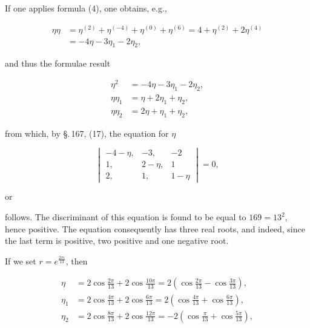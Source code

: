 
If one applies formula (4), one obtains, e.g.,

\[
\begin{aligned}
\eta\eta &= \eta^{(2)} + \eta^{(-4)} + \eta^{(0)} + \eta^{(6)} = 4 + \eta^{(2)} + 2\eta^{(4)}\\
&= -4\eta - 3\eta_1 - 2\eta_2,
\end{aligned}
\]

and thus the formulae result

\[
\begin{aligned}
\eta^2 &= -4\eta - 3\eta_1 - 2\eta_2,\\
\eta\eta_1 &= \eta + 2\eta_1 + \eta_2,\\
\eta\eta_2 &= 2\eta + \eta_1 + \eta_2,
\end{aligned}
\]

from which, by \S.\,167, (17), the equation for $\eta$

\[
\begin{vmatrix}
-4-\eta, & -3, & -2\\
1, & 2-\eta, & 1\\
2, & 1, & 1-\eta
\end{vmatrix} = 0,
\]

or


follows. The discriminant of this equation is found to be equal to
$169 = 13^2$, hence positive. The equation consequently has three real
roots, and indeed, since the last term is positive, two positive and one
negative root.

If we set $r = e^{\frac{2\pi i}{13}}$, then

\[
\begin{aligned}
\eta &= 2\cos\frac{2\pi}{13} + 2\cos\frac{10\pi}{13} = 2\left(\cos\frac{2\pi}{13} - \cos\frac{3\pi}{13}\right),\\
\eta_1 &= 2\cos\frac{4\pi}{13} + 2\cos\frac{6\pi}{13} = 2\left(\cos\frac{4\pi}{13} + \cos\frac{6\pi}{13}\right),\\
\eta_2 &= 2\cos\frac{8\pi}{13} + 2\cos\frac{12\pi}{13} = -2\left(\cos\frac{\pi}{13} + \cos\frac{5\pi}{13}\right),
\end{aligned}
\]

